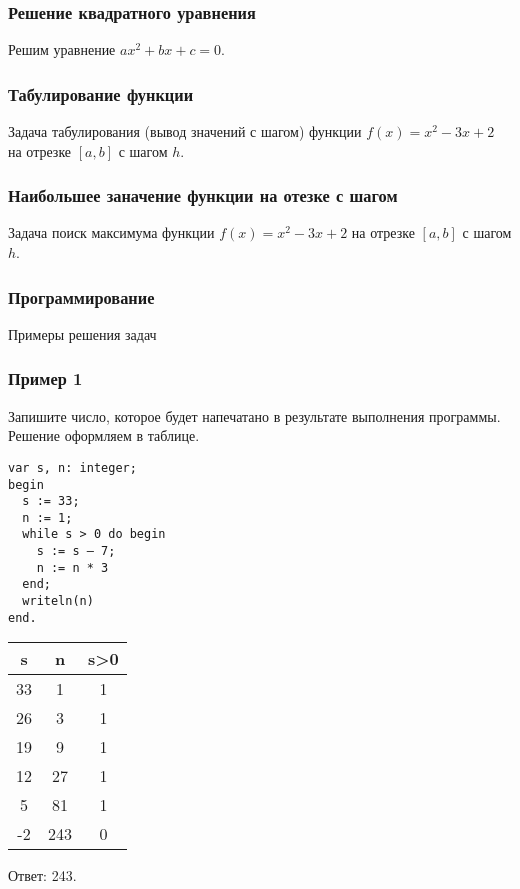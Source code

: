 \begin{frame}[fragile]
\frametitle{Решение квадратного уравнения}

Решим уравнение $ax^2+bx+c=0$.


    
\end{frame}

\begin{frame}[fragile]
\frametitle{Табулирование функции}

Задача табулирования (вывод значений с шагом) функции $f(x)=x^2-3x+2$ на отрезке $[a,b]$ с шагом $h$.


    
\end{frame}

\begin{frame}[fragile]
\frametitle{Наибольшее заначение функции на отезке с шагом}

Задача поиск максимума функции $f(x)=x^2-3x+2$ на отрезке $[a,b]$ с шагом $h$.

    
\end{frame}

\begin{frame}
\frametitle{Программирование}

\begin{center}

\Huge
Примеры решения задач
\end{center}
\end{frame}

\begin{frame}[fragile]
\frametitle{Пример 1}

Запишите число, которое будет напечатано в результате выполнения программы. Решение оформляем в таблице.
\begin{multicols}{2}
\begin{lstlisting}[style=CStyle]
var s, n: integer;
begin
  s := 33;
  n := 1;
  while s > 0 do begin
    s := s – 7;
    n := n * 3
  end;
  writeln(n)
end.
\end{lstlisting}
\columnbreak
\begin{tabular}{|c|c|c|}
\hline 
s & n & s>0\tabularnewline
\hline 
\hline 
33 & 1 & 1\tabularnewline
\hline 
26 & 3 & 1\tabularnewline
\hline 
19 & 9 & 1\tabularnewline
\hline 
12 & 27 & 1\tabularnewline
\hline 
5 & 81 & 1\tabularnewline
\hline 
-2 & 243 & 0\tabularnewline
\hline 
\end{tabular}

Ответ: 243.
\end{multicols}


    
\end{frame}


